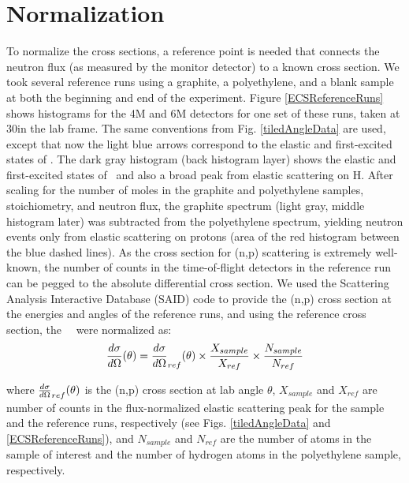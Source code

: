 \section{Normalization}
To normalize the cross sections, a reference point is needed that connects the
neutron flux (as measured by the monitor detector) to a known cross section.
We took several reference runs using a graphite,
a polyethylene, and a blank sample at both the beginning and end of the experiment.
Figure \ref{ECSReferenceRuns} shows histograms for the 4M and 6M detectors for
one set of these runs, taken at 30\textdegree in the lab frame.
The same conventions from Fig.
\ref{tiledAngleData} are used, except that now the light blue arrows correspond to
the elastic and first-excited states of \cTwelve. The dark gray histogram (back
histogram layer) shows the elastic and first-excited states
of \cTwelve\ and also a broad peak from elastic scattering on H.
After scaling for the number
of moles in the graphite and polyethylene samples, stoichiometry, and neutron
flux, the graphite spectrum (light gray, middle histogram later) was subtracted from the polyethylene
spectrum, yielding neutron events only from elastic scattering on protons (area of
the red histogram between the blue dashed lines). As the cross section for
(n,p) scattering is extremely well-known, the number of counts in the
time-of-flight detectors in the reference run can be pegged to the absolute
differential cross section.
We used the Scattering Analysis Interactive Database (SAID) code \cite{SAIDCode}
to provide the (n,p) cross section at the energies and angles of the reference
runs, and using the reference cross section, the \snTwelveFour\
\el\ were normalized as:
\begin{equation} \label{ECSCalculation}
    \el(\theta) = \el_{ref}(\theta)
    \times \frac{X_{sample}}{X_{ref}} \times
    \frac{N_{sample}}{N_{ref}}
\end{equation}

\noindent
where $\el_{ref}(\theta)$ is the (n,p) cross section at lab angle $\theta$, $X_{sample}$
and $X_{ref}$ are number of counts in the flux-normalized elastic scattering peak for the sample
and the reference runs, respectively (see Figs. \ref{tiledAngleData} and
\ref{ECSReferenceRuns}), and $N_{sample}$ and $N_{ref}$ are the number of atoms in
the sample of interest and the number of hydrogen atoms in the polyethylene
sample, respectively.

